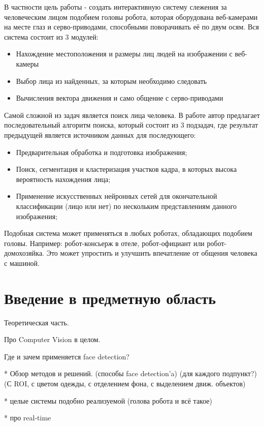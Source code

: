 \documentclass[12pt]{report}
\newenvironment{myItemize}{
	\begin{itemize}
  		\setlength{\itemsep}{1pt}
  		\setlength{\parskip}{0pt}
  		\setlength{\parsep}{0pt}
}{\end{itemize}}
\begin{document}
В частности цель работы - создать интерактивную систему слежения за человеческим лицом подобием головы робота, которая оборудована веб-камерами на месте глаз и серво-приводами, способными поворачивать её по двум осям. Вся система состоит из 3 модулей:
\begin{myItemize}
\item Нахождение местоположения и размеры лиц людей на изображении с веб-камеры
\item Выбор лица из найденных, за которым необходимо следовать
\item Вычисления вектора движения и само общение с серво-приводами
\end{myItemize}

Самой сложной из задач является поиск лица человека. В работе автор предлагает последовательный алгоритм поиска, который состоит из 3 подзадач, где результат предыдущей является источником данных для последующего:
\begin{myItemize}
\item Предварительная обработка и подготовка изображения;
\item Поиск, сегментация и кластеризация участков кадра, в которых высока вероятность нахождения лица;
\item Применение искусственных нейронных сетей для окончательной классификации (лицо или нет) по нескольким представлениям данного изображения;
\end{myItemize}

Подобная система может применяться в любых роботах, обладающих подобием головы.
Например: робот-консьерж в отеле, робот-официант или робот-домохозяйка. Это может упростить и улучшить
впечатление от общения человека с машиной.

\chapter{Введение в предметную область}
\thispagestyle{fancy}

Теоретическая часть.

Про Computer Vision в целом.

Где и зачем применяется face detection?

* Обзор методов и решений. (способы face detection’a) (для каждого подпункт?) (С ROI, с цветом одежды, с отделением фона, с выделением движ. объектов)

* целые системы подобно реализуемой (голова робота и всё такое)

* про real-time
\end{document}
